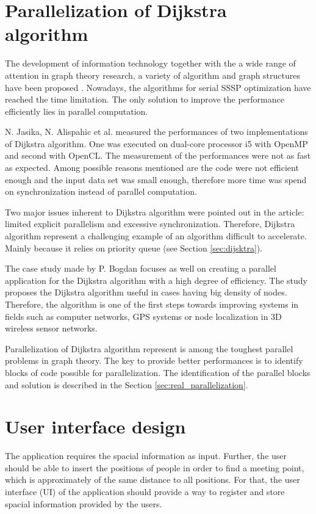 \documentclass[thesis=M,english]{FITthesis}[2012/10/20]
\begin{document}
\section{Parallelization of Dijkstra algorithm}
The development of information technology together with the a wide range of attention in graph theory research, a variety of algorithm and graph structures have been proposed \cite{Peng09}. Nowadays, the algorithms for serial SSSP optimization have reached the time limitation. The only solution to improve the performance efficiently lies in parallel computation. 

N. Jasika, N. Alispahic et al.\cite{Jasika12} measured the performances of two implementations of Dijkstra algorithm. One was executed on dual-core processor i5 with OpenMP and second with OpenCL. The measurement of the performances were not as fast as expected. Among possible reasons mentioned are the code were not efficient enough and the input data set was small enough, therefore more time was spend on synchronization instead of parallel computation.

Two major issues inherent to Dijkstra algorithm were pointed out in the article: limited explicit parallelism and excessive synchronization. Therefore, Dijkstra algorithm represent a challenging example of an algorithm difficult to accelerate. Mainly because it relies on priority queue (see Section \ref{sec:dijsktra}).

The case study made by P. Bogdan \cite{Bogdan15} focuses as well on creating a parallel application for the Dijkstra algorithm with a high degree of efficiency. The study proposes the Dijkstra algorithm useful in cases having big density of nodes. Therefore, the algorithm is one of the first steps towards improving systems in fields such as computer networks, GPS systems or node localization in 3D wireless sensor networks.

Parallelization of Dijkstra algorithm represent is among the toughest parallel problems in graph theory. The key to provide better performances is to identify blocks of code possible for parallelization. The identification of the parallel blocks and solution is described in the Section \ref{sec:real_parallelization}.

\section{User interface design}
\label{sec:UIDesign}
The application requires the spacial information as input. 
Further, the user should be able to insert the positions of people in order to find a meeting point, which is approximately of the same distance to all positions. For that, the user interface (UI) of the application should provide a way to register and store spacial information provided by the users. 
\end{document}
